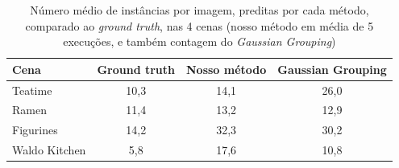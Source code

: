 \begin{table}[H]
\centering
\caption{Métricas de segmentação de instância 2D: nosso método \textit{versus} \textit{Gaussian Grouping}, nas 4 cenas do LERF-OVS (IoU $\geq 0{,}5$; nosso método em média de 5 execuções, \textit{Gaussian Grouping} com uma única medição)}
\label{tab:metricas_2d_experimento4}
\end{table}

\begin{table}[H]
\centering
\caption{Número médio de instâncias por imagem, preditas por cada método, comparado ao \textit{ground truth}, nas 4 cenas (nosso método em média de 5 execuções, e também contagem do \textit{Gaussian Grouping})}
\label{tab:instancias_experimento4}
\begin{tabular}{lccc}
\hline
\textbf{Cena} & \textbf{Ground truth} & \textbf{Nosso método} & \textbf{Gaussian Grouping} \\
\hline
Teatime & 10{,}3 & 14{,}1 & 26{,}0 \\
Ramen & 11{,}4 & 13{,}2 & 12{,}9 \\
Figurines & 14{,}2 & 32{,}3 & 30{,}2 \\
Waldo Kitchen & 5{,}8 & 17{,}6 & 10{,}8 \\
\hline
\end{tabular}
\end{table}

